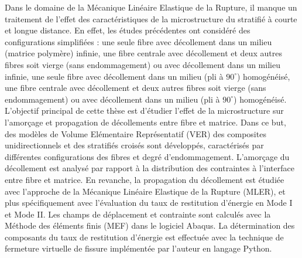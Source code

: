 Dans le domaine de la M\'ecanique Lin\'eaire Elastique de la Rupture, il manque un traitement de l'effet des caract\'eristiques de la microstructure du stratifi\'e \`a courte et longue distance. En effet, les \'etudes pr\'ec\'edentes ont consid\'er\'e des configurations simplifi\'ees : une seule fibre avec d\'ecollement dans un milieu (matrice polym\`ere) infinie, une fibre centrale avec d\'ecollement et deux autres fibres soit vierge (sans endommagement) ou avec d\'ecollement dans un milieu infinie, une seule fibre avec d\'ecollement dans un milieu (pli \`a $90^{\circ}$) homog\'en\'eis\'e, une fibre centrale avec d\'ecollement et deux autres fibres soit vierge (sans endommagement) ou avec d\'ecollement dans un milieu (pli \`a $90^{\circ}$) homog\'en\'eis\'e.\\

L'objectif principal de cette th\`ese est d'\'etudier l'effet de la microstructure sur l'amor\c{c}age et propagation de d\'ecollements entre fibre et matrice. Dans ce but, des mod\`eles de Volume El\'ementaire Repr\'esentatif (VER) des composites unidirectionnels et des stratifi\'es crois\'es sont d\'evelopp\'es, caract\'eris\'es par diff\'erentes configurations des fibres et degr\'e d'endommagement. L'amor\c{c}age du d\'ecollement est analys\'e par rapport \`a la distribution des contraintes \`a l'interface entre fibre et matrice. En revanche, la propagation du d\'ecollement est \'etudi\'ee avec l'approche de la M\'ecanique Lin\'eaire Elastique de la Rupture (MLER), et plus sp\'ecifiquement avec l'\'evaluation du taux de restitution d'\'energie en Mode I et Mode II. Les champs de d\'eplacement et contrainte sont calcul\'es avec la M\'ethode des \'el\'ements finis (MEF) dans le logiciel Abaqus. La d\'etermination des composants du taux de restitution d'\'energie est effectu\'ee avec la technique de fermeture virtuelle de fissure impl\'ement\'ee par l'auteur en langage Python.\\

